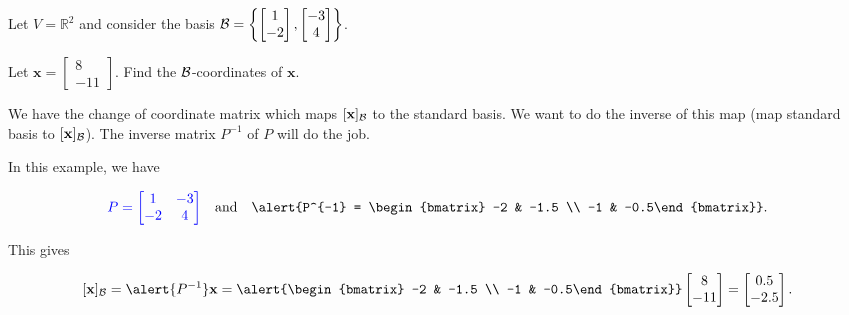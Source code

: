 \documentclass[xcolor=dvipsnames,aspectratio=169,t]{beamer}
\begin{document}
\begin{frame}

Let $V = \mathbb{R}^2$  and consider the basis  $\mathcal{B} = \left\{ \begin{bmatrix} 1 \\ -2 \end{bmatrix} , \begin{bmatrix} -3 \\ 4 \end{bmatrix} \right\}$.

Let $\mathbf{x} = \begin{bmatrix} 8 \\ -11 \end{bmatrix}$. Find the $\mathcal{B}$-coordinates of $\mathbf{x}$.

\pause
\bi
\ii We have the change of coordinate matrix  which maps $\lbrack \mathbf{x} \rbrack_{\mathcal{B}}$ to the standard basis. 
\ii We want to do the inverse of this map (map standard basis to $\lbrack \mathbf{x} \rbrack_{\mathcal{B}}$).
\ii The inverse matrix $P^{-1}$ of $P$ will do the job.
\ei

\pause
In this example, we have

\[ \colorb{P = \begin{bmatrix} 1 & -3 \\ -2 & 4 \end{bmatrix}} \quad \mbox{and} \quad \alert{P^{-1} = \begin{bmatrix} -2 & -1.5 \\ -1 & -0.5\end{bmatrix}}. \]

This gives

\[ \lbrack \mathbf{x} \rbrack_{\B} = \alert{P^{-1}} \mathbf{x} =  \alert{\begin{bmatrix} -2 & -1.5 \\ -1 & -0.5\end{bmatrix}} \begin{bmatrix} 8 \\ -11 \end{bmatrix} = \begin{bmatrix} 0.5 \\ -2.5 \end{bmatrix}. \]
\end{frame}
\end{document}
